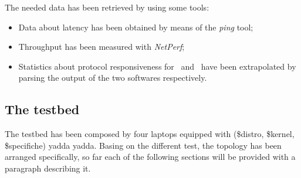     The needed data has been retrieved by using some tools:
    \begin{itemize}
    \item   Data about latency has been obtained by means of the
            \emph{ping} tool;
    \item   Throughput has been measured with
            \emph{NetPerf}\cite{bib:NetPerf};
    \item   Statistics about protocol responsiveness for \batman\ and
            \olsr\ have been extrapolated by parsing the output of the
            two softwares respectively.
    \end{itemize}

\subsection{The testbed}

    The testbed has been composed by four laptops equipped with
    (\$distro, \$kernel, \$specifiche) yadda yadda. Basing on the
    different test, the topology has been arranged specifically, so
    far each of the following sections will be provided with a
    paragraph describing it.
